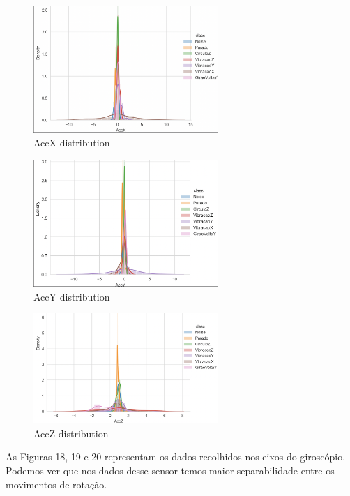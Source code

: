 \begin{figure}[H]
    \center
    \includegraphics[width=7cm]{images/AccXdistribution.png}
    \caption{ AccX distribution }
\end{figure}
\begin{figure}[H]
    \center
    \includegraphics[width=7cm]{images/AccYdistribution.png}
    \caption{ AccY distribution }
\end{figure}
\begin{figure}[H]
    \center
    \includegraphics[width=7cm]{images/AccZdistribution.png}
    \caption{ AccZ distribution }
\end{figure}

As Figuras 18, 19 e 20 representam os dados recolhidos nos eixos do giroscópio.
Podemos ver que nos dados desse sensor temos maior separabilidade entre os movimentos de rotação.

